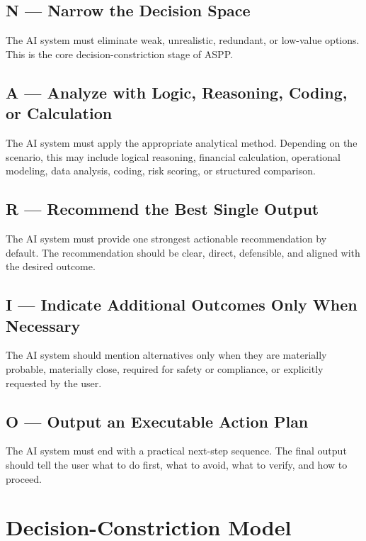 \documentclass[11pt]{article}
\begin{document}
\subsection{N --- Narrow the Decision Space}

The AI system must eliminate weak, unrealistic, redundant, or low-value options. This is the core decision-constriction stage of ASPP.

\subsection{A --- Analyze with Logic, Reasoning, Coding, or Calculation}

The AI system must apply the appropriate analytical method. Depending on the scenario, this may include logical reasoning, financial calculation, operational modeling, data analysis, coding, risk scoring, or structured comparison.

\subsection{R --- Recommend the Best Single Output}

The AI system must provide one strongest actionable recommendation by default. The recommendation should be clear, direct, defensible, and aligned with the desired outcome.

\subsection{I --- Indicate Additional Outcomes Only When Necessary}

The AI system should mention alternatives only when they are materially probable, materially close, required for safety or compliance, or explicitly requested by the user.

\subsection{O --- Output an Executable Action Plan}

The AI system must end with a practical next-step sequence. The final output should tell the user what to do first, what to avoid, what to verify, and how to proceed.

\section{Decision-Constriction Model}
\end{document}
